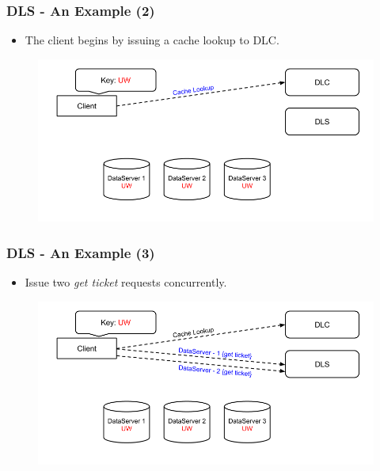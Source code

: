 \documentclass{beamer}
\begin{document}
\begin{frame}
  \frametitle{DLS - An Example (2)}
  \begin{itemize}
  \item The client begins by issuing a cache lookup to DLC.
\newline
  \end{itemize}
  \begin{figure}
    \begin{center}
      \centerline{\includegraphics[scale=0.40]{img/DLS_Example02.png}}
    \end{center}
  \end{figure}
\end{frame}

\begin{frame}
  \frametitle{DLS - An Example (3)}
  \begin{itemize}
  \item Issue two \textit{get ticket} requests concurrently.
\newline
  \end{itemize}
  \begin{figure}
    \begin{center}
      \centerline{\includegraphics[scale=0.40]{img/DLS_Example03.png}}
    \end{center}
  \end{figure}
\end{frame}
\end{document}
